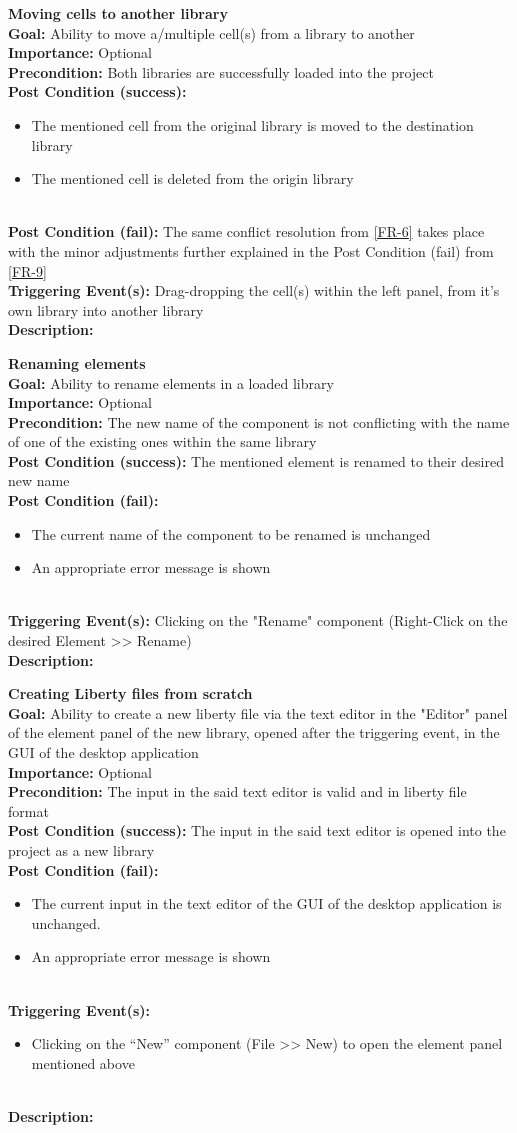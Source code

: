 \documentclass[10pt,a4paper]{report}
\newcommand{\precondition}[1]{
    \textbf{Precondition: } #1 \leavevmode \\
}
\newcommand{\FRDescription}[8]{
    \textbf{#1} \leavevmode \\
    \textbf{Goal: } #2 \leavevmode \\
    \textbf{Importance: } #3 \leavevmode \\
    \precondition{#4}
    \textbf{Post Condition (success): } #5 \leavevmode \\
    \textbf{Post Condition (fail): } #6 \leavevmode \\
    \textbf{Triggering Event(s): } #7 \leavevmode \\
    \textbf{Description: } \leavevmode \\ 
    #8}
\newcommand{\FRODescription}[8]{
    \textbf{#1} \leavevmode \\
    \textbf{Goal: } #2 \leavevmode \\
    \textbf{Importance: } #3 \leavevmode \\
    \precondition{#4}
    \textbf{Post Condition (success): } #5 \leavevmode \\
    \textbf{Post Condition (fail): } #6 \leavevmode \\
    \textbf{Triggering Event(s): } #7 \leavevmode \\
    \textbf{Description: } \leavevmode \\
    #8}
\begin{document}
\begin{FRO}
    \item \FRDescription{Moving cells to another library}
    {Ability to move a/multiple cell(s) from a library to another}
    {Optional}
    {Both libraries are successfully loaded into the project}
    {\begin{itemize}
        \item The mentioned cell from the original library is moved to the destination library
        \item The mentioned cell is deleted from the origin library
    \end{itemize}}
    {The same conflict resolution from \ref{FR-6} takes place with the minor adjustments further explained in the Post Condition (fail) from \ref{FR-9}}
    {Drag-dropping the cell(s) within the left panel, from it's own library into another library}
    \item \FRODescription{Renaming elements}
    {Ability to rename elements in a loaded library}
    {Optional}
    {The new name of the component is not conflicting with the name of one of the existing ones within the same library}
    {The mentioned element is renamed to their desired new name}
    {\begin{itemize}
        \item The current name of the component to be renamed is unchanged
        \item An appropriate error message is shown
    \end{itemize}}
    {Clicking on the "Rename" component (Right-Click on the desired Element  >> Rename)}
    \item \FRODescription{Creating Liberty files from scratch}
    {Ability to create a new liberty file via the text editor in the "Editor" panel of the element panel of the new library, opened after the triggering event, in the GUI of the desktop application}
    {Optional}
    {The input in the said text editor is valid and in liberty file format}
    {The input in the said text editor is opened into the project as a new library}
    {\begin{itemize}
        \item The current input in the text editor of the GUI of the desktop application is unchanged.
        \item An appropriate error message is shown
    \end{itemize}}
    {\begin{itemize}
        \item Clicking on the “New” component (File >> New) to open the element panel mentioned above

\end{itemize}}
\end{FRO}
\end{document}
